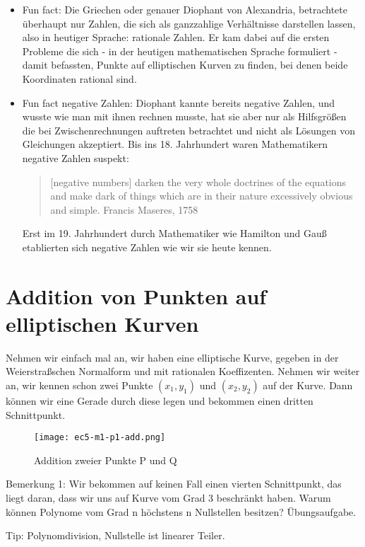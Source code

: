 \documentclass{article}
\begin{document}
\begin{itemize}
\item
  Fun fact: Die Griechen oder genauer Diophant von Alexandria, betrachtete
  überhaupt nur Zahlen, die sich als ganzzahlige Verhältnisse darstellen
  lassen, also in heutiger Sprache: rationale Zahlen. Er kam dabei auf die
  ersten Probleme die sich - in der heutigen mathematischen Sprache formuliert -
  damit befassten, Punkte auf elliptischen Kurven zu finden, bei denen beide
  Koordinaten rational sind.
\item
  Fun fact negative Zahlen: Diophant kannte bereits negative Zahlen,
  und wusste wie man mit ihnen rechnen musste, hat sie aber nur als
  Hilfsgrößen die bei Zwischenrechnungen auftreten betrachtet und
  nicht als Lösungen von Gleichungen akzeptiert. Bis
  ins 18. Jahrhundert waren Mathematikern negative Zahlen
  suspekt:
  \begin{quote}
    [negative numbers] darken the
  very whole doctrines of the equations and make dark of things which
  are in their nature excessively obvious and simple.
  \hfill Francis Maseres, 1758
  \end{quote}
  Erst im 19. Jahrhundert durch Mathematiker wie Hamilton und Gauß
  etablierten sich negative Zahlen wie wir sie heute kennen.
\end{itemize}

\section{Addition von Punkten auf elliptischen Kurven}

Nehmen wir einfach mal an, wir haben eine elliptische Kurve, gegeben in der
Weierstraßschen Normalform und mit rationalen
Koeffizenten. Nehmen wir weiter an, wir kennen schon zwei Punkte $(x_1, y_1)$
und $(x_2, y_2)$ auf
der Kurve. Dann können wir eine Gerade durch diese legen und bekommen
einen dritten Schnittpunkt.

\begin{figure}[h]
  \centering
  \texttt{[image: ec5-m1-p1-add.png]}
  \caption{Addition zweier Punkte P und Q}
  
\end{figure}

Bemerkung 1: Wir bekommen auf keinen Fall einen vierten Schnittpunkt, das
liegt daran, dass wir uns auf Kurve vom Grad 3 beschränkt haben. Warum
können Polynome vom Grad n höchstens n Nullstellen besitzen? Übungsaufgabe.

Tip: Polynomdivision, Nullstelle ist linearer Teiler.
\end{document}
